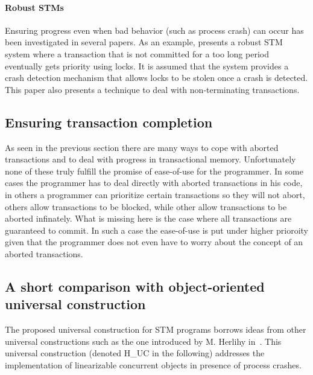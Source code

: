 \paragraph{Robust STMs} 
Ensuring progress even when bad behavior (such as process crash) can occur 
has been investigated in several papers. As an example,  \cite{WRFF10} 
presents a robust STM system where a transaction that is not committed 
for a too long period eventually gets  priority using locks. It is assumed 
that  the system   provides a   crash detection  mechanism that  allows 
locks to be stolen once a  crash  is detected. This paper also presents a
technique to deal with  non-terminating transactions. 



\subsection{Ensuring transaction completion}
As seen in the previous section there are many ways to cope with aborted transactions
and to deal with progress in transactional memory.
Unfortunately none of these truly fulfill the promise of ease-of-use for the
programmer.
In some cases the programmer has to deal directly with aborted transactions
in his code, in others a programmer can prioritize certain transactions
so they will not abort, others allow transactions to be blocked, while
other allow transactions to be aborted infinately.
What is missing here is the case where all transactions are guaranteed to
commit.
In such a case the ease-of-use is put under higher prioroity
given that the programmer does not even have to worry about the concept
of an aborted transactions.

\subsection{A short comparison with object-oriented universal construction}
\label{sec:comparison-Herlihy}


The proposed universal construction for STM programs borrows ideas from other 
universal constructions such as the one introduced by M. Herlihy 
in~\cite{H91}.  This universal  construction (denoted H\_UC in the following) 
addresses  the  implementation  of linearizable concurrent objects in 
presence  of process crashes. 


